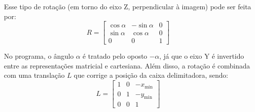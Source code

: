     Esse tipo de rotação (em torno do eixo Z, perpendicular à imagem) pode ser feita por:
    \[
        R = \begin{bmatrix}
            \cos\alpha & -\sin\alpha & 0 \\
            \sin\alpha & \cos\alpha & 0 \\
            0 & 0 & 1
        \end{bmatrix}
    \]

    No programa, o ângulo $\alpha$ é tratado pelo oposto $-\alpha$, já que o eixo Y é invertido entre as representações matricial e cartesiana. Além disso, a rotação é combinada com uma translação $L$ que corrige a posição da caixa delimitadora, sendo:
    \[
        L = \begin{bmatrix}
            1 & 0 & -x_{\min} \\
            0 & 1 & -y_{\min} \\
            0 & 0 & 1
        \end{bmatrix}
    \]
